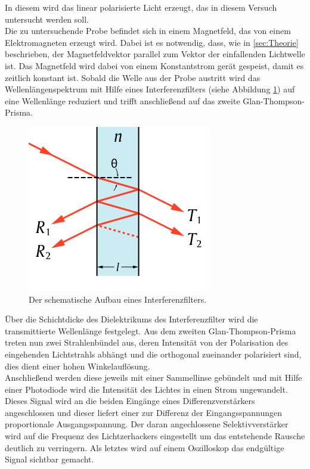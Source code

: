 In diesem wird das linear polarisierte Licht erzeugt, das in diesem Versuch untersucht werden soll.\\ Die zu untersuchende Probe befindet sich in einem Magnetfeld, das von einem Elektromagneten erzeugt wird.
Dabei ist es notwendig, dass, wie in
\ref{sec:Theorie} beschrieben, der Magnetfeldvektor parallel zum Vektor der einfallenden Lichtwelle ist. Das Magnetfeld wird dabei von einem Konstantstrom gerät gespeist, damit es zeitlich konstant ist. Sobald die Welle aus der Probe austritt wird das Wellenlängenspektrum mit Hilfe eines Interferenzfilters (siehe Abbildung \ref{fig:inter}) auf eine Wellenlänge reduziert und trifft anschließend auf das zweite Glan-Thompson-Prisma.
\begin{figure}[h!]
  \centering
  \includegraphics[scale=0.5]{fig/inter.png}
  \caption{Der schematische Aufbau eines Interferenzfilters. \cite{Anleitung4}}
  \label{fig:inter}
\end{figure}
Über die Schichtdicke des Dielektrikums des Interferenzfilter wird die transmittierte Wellenlänge festgelegt. Aus dem zweiten Glan-Thompson-Prisma treten nun zwei Strahlenbündel aus, deren
Intensität von der Polarisation des eingehenden Lichtstrahls abhängt und die orthogonal zueinander polarisiert sind, dies dient einer hohen Winkelauflösung.\\
Anschließend werden diese jeweils mit einer Sammellinse gebündelt und mit Hilfe einer Photodiode wird die Intensität des Lichtes in einen Strom ungewandelt. Dieses Signal wird an die beiden Eingänge eines
Differenzverstärkers angeschlossen und dieser liefert einer zur Differenz der Eingangsspannungen proportionale Ausgangsspannung. Der daran angechlossene Selektivverstärker wird auf die Frequenz des Lichtzerhackers eingestellt um
das entstehende Rausche deutlich zu verringern. Als letztes wird auf einem Oszilloskop das endgültige Signal sichtbar gemacht.
